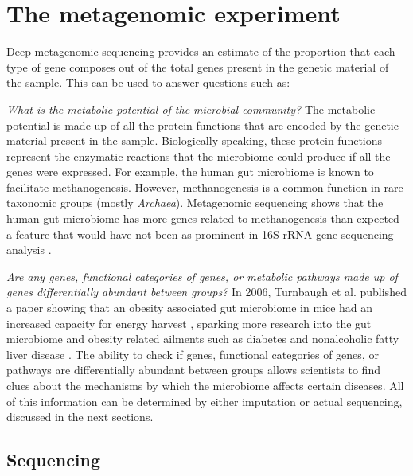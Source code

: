 \section{The metagenomic experiment}
Deep metagenomic sequencing provides an estimate of the proportion that each type of gene composes out of the total genes present in the genetic material of the sample. This can be used to answer questions such as:

\textit{What is the metabolic potential of the microbial community?}
The metabolic potential is made up of all the protein functions that are encoded by the genetic material present in the sample. Biologically speaking, these protein functions represent the enzymatic reactions that the microbiome could produce if all the genes were expressed. For example, the human gut microbiome is known to facilitate methanogenesis. However, methanogenesis is a common function in rare taxonomic groups (mostly \textit{Archaea}). Metagenomic sequencing shows that the human gut microbiome has more genes related to methanogenesis than expected - a feature that would have not been as prominent in 16S rRNA gene sequencing analysis \cite{gill2006metagenomic}.

\textit{Are any genes, functional categories of genes, or metabolic pathways made up of genes differentially abundant between groups?}
In 2006, Turnbaugh et al. published a paper showing that an obesity associated gut microbiome in mice had an increased capacity for energy harvest \cite{turnbaugh2006obesity}, sparking more research into the gut microbiome and obesity related ailments such as diabetes \cite{larsen2010gut} and nonalcoholic fatty liver disease \cite{zhu2013characterization}. The ability to check if genes, functional categories of genes, or pathways are differentially abundant between groups allows scientists to find clues about the mechanisms by which the microbiome affects certain diseases. All of this information can be determined by either imputation or actual sequencing, discussed in the next sections.

\subsection{Sequencing}

